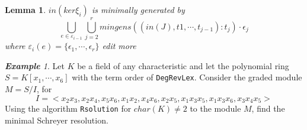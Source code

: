 \documentclass{article}
\newtheorem{lemma}[theorem]{Lemma}
\theoremstyle{definition}
\theoremstyle{remark}
\theoremstyle{example}
\newtheorem{example}{\textbf{Example}}[section]
\begin{document}
\begin{lemma}\label{lem:mingens}
    $in(ker\xi_i)$ is minimally generated by
    \begin{equation}
        \bigcup_{e\in{\varepsilon}_{i-1}}{\bigcup_{j = 2}^{r}{mingens((in(J),t1,\cdots,t_{j-1}):t_j)\cdot \epsilon_j}}
    \end{equation}
    where $\varepsilon_i(e) = \{\epsilon_1,\cdots,\epsilon_r\}$
    \textcolor{BrickRed}{edit more}
\end{lemma}

\begin{example}
    Let $K$ be a field of any characteristic and let the polynomial ring $S = K[x_1,\cdots,x_6]$ with the term order of \verb+DegRevLex+. Consider the graded module $M = S/I$, for 
    \begin{equation}
        I = <x_2x_3,x_2x_4,x_5x_6,x_1x_2,x_4x_6,x_2x_5,x_1x_3x_5,x_1x_3x_6,x_3x_4x_5>
    \end{equation} 
    Using the algorithm \verb+Rsolution+ for $char(K) \neq 2$ to the module $M$, find the minimal Schreyer resolution.
\end{example}

\paragraph{  }
\end{document}
